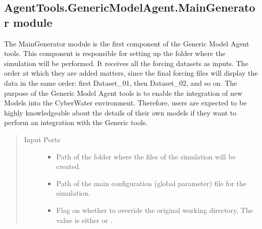 \documentclass[letterpaper,10pt,english]{sphinxmanual}
\begin{document}
\subsection{AgentTools.GenericModelAgent.MainGenerator module}
\label{\detokenize{AgentTools.GenericModelAgent:module-AgentTools.GenericModelAgent.MainGenerator}}\label{\detokenize{AgentTools.GenericModelAgent:agenttools-genericmodelagent-maingenerator-module}}

\begin{fulllineitems}
\label{\detokenize{AgentTools.GenericModelAgent:AgentTools.GenericModelAgent.MainGenerator.MainGenerator}}
The MainGenerator module is the first component of the Generic Model Agent tools.
This component is responsible for setting up the folder where the simulation will be performed.
It receives all the forcing datasets as inputs. The order at which they are added matters,
since the final forcing files will display the data in the same order:
first Dataset\_01, then Dataset\_02, and so on.
The purpose of the Generic Model Agent tools is to enable the integration of new Models into the
CyberWater environment. Therefore, users are expected to be highly knowledgeable about the
details of their own models if they want to perform an integration with the Generic tools.
\begin{quote}\begin{description}
\item[{Input Ports}] \leavevmode\begin{itemize}
\item {} 
 Path of the folder where the files of the simulation will be created.

\item {} 
 Path of the main configuration (global parameter) file for the simulation.

\item {} 
 Flag on whether to override the original working directory, The value is either  or .


\end{itemize}
\end{description}
\end{quote}
\end{fulllineitems}
\end{document}
